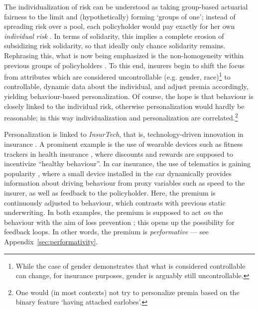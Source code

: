 \documentclass[11pt]{article} %
\makeatletter
\newcommand*{\eg}{e.g.\@\xspace}
\makeatother
\begin{document}
The individualization of risk can be understood as taking group-based actuarial fairness to the limit and (hypothetically) forming `groups of one'; instead of spreading risk over a pool, each policyholder would pay exactly for her own \textit{individual risk} \citep{cevolini2020pool}. In terms of solidarity, this implies a complete erosion of subsidizing risk solidarity, so that ideally only chance solidarity remains. Rephrasing this, what is now being emphasized is the non-homogeneity within previous groups of policyholders \citep{barry2020insurance}.
To this end, insurers begin to shift the focus from attributes which are considered uncontrollable (\eg gender, race)\footnote{While the case of gender demonstrates that what is considered controllable can change, for insurance purposes, gender is arguably still uncontrollable.} to controllable, dynamic data about the individual, and adjust premia accordingly, yielding behaviour-based personalization. Of course, the hope is that behaviour is closely linked to the individual risk, otherwise personalization would hardly be reasonable; in this way individualization and personalization are correlated.\footnote{One would (in most contexts) not try to personalize premia based on the binary feature `having attached earlobes'.} 

Personalization is linked to \textit{InsurTech}, that is, technology-driven innovation in insurance \citep{mcfall2020personalisation}. A prominent example is the use of wearable devices such as fitness trackers in health insurance \citep{lupton2016diverse,mcfall2019personalizing}, where discounts and rewards are supposed to incentivize ``healthy behaviour''. In car insurance, the use of telematics is gaining popularity \citep{verbelen2018unravelling,meyers2018enacting,cevolini2022actuarial}, where a small device installed in the car dynamically provides information about driving behaviour from proxy variables such as speed to the insurer, as well as feedback to the policyholder. Here, the premium is continuously adjusted to behaviour, which contrasts with previous static underwriting. In both examples, the premium is supposed to act \textit{on} the behaviour with the aim of loss prevention \citep{mcfall2018or}; this opens up the possibility for feedback loops. In other words, the premium is \textit{performative} --- see Appendix~\ref{sec:performativity}.
\end{document}
